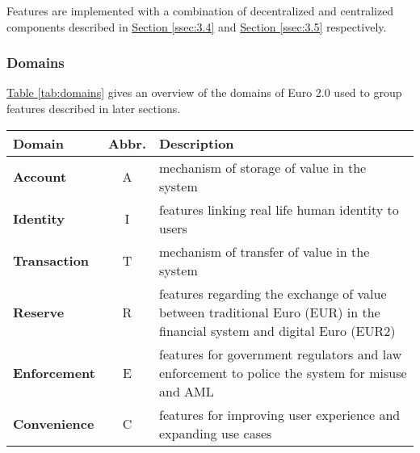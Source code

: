 \documentclass[12pt]{article} %
\newcommand{\hypertableref}[1]{\hyperref[#1]{Table \ref{#1}}}
\newcommand{\hypersectionref}[1]{\hyperref[#1]{Section \ref{#1}}}
\begin{document}
{{Features are implemented with a combination of decentralized and centralized components described in \hypersectionref{ssec:3.4} and \hypersectionref{ssec:3.5} respectively.

\subsubsection{Domains} \label{sssec:3.3:domains}

\hypertableref{tab:domains} gives an overview of the domains of Euro 2.0 used to group features described in later sections.

\begin{center}
\begin{tabular}{ | l | c | p{10cm} | }
 \hline
 Domain & Abbr. & Description \\
 \hline
 \textbf{Account} & A & mechanism of storage of value in the system
 \\ \hline
 \textbf{Identity} & I & features linking real life human identity to users
 \\ \hline
 \textbf{Transaction} & T & mechanism of transfer of value in the system
 \\ \hline
 \textbf{Reserve} & R & features regarding the exchange of value between traditional Euro (EUR) in the financial system and digital Euro (EUR2)
 \\ \hline
 \textbf{Enforcement} & E & features for government regulators and law enforcement to police the system for misuse and AML
 \\ \hline
 \textbf{Convenience} & C & features for improving user experience and expanding use cases
 \\ \hline
\end{tabular}
\end{center}
\label{tab:domains}

%

}}
\end{document}
